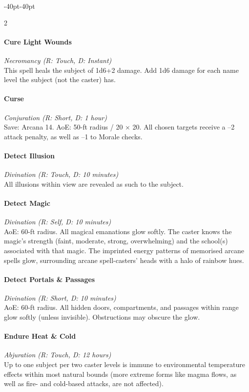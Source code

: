 \documentclass{book}
\begin{document}
\begin{adjustwidth}{-40pt}{-40pt}
\begin{multicols}{2}
\paragraph{Cure Light Wounds}\label{cure-light-wounds}
\emph{Necromancy (R: Touch, D: Instant)}\\
This spell heals the subject of 1d6+2 damage. Add 1d6 damage for each
name level the subject (not the caster) has.

\paragraph{Curse}\label{curse}
\emph{Conjuration (R: Short, D: 1 hour)}\\
Save: Arcana 14. AoE: 50-ft radius / 20 × 20. All chosen targets receive
a --2 attack penalty, as well as --1 to Morale checks.

\paragraph{Detect Illusion}\label{detect-illusion}
\emph{Divination (R: Touch, D: 10 minutes)}\\
All illusions within view are revealed as such to the subject.

\paragraph{Detect Magic}\label{detect-magic}
\emph{Divination (R: Self, D: 10 minutes)}\\
AoE: 60-ft radius. All magical emanations glow softly. The caster knows
the magic's strength (faint, moderate, strong, overwhelming) and the
school(s) associated with that magic. The imprinted energy patterns of
memorised arcane spells glow, surrounding arcane spell-casters' heads
with a halo of rainbow hues.

\paragraph{Detect Portals \& Passages}\label{detect-portals-passages}
\emph{Divination (R: Short, D: 10 minutes)}\\
AoE: 60-ft radius. All hidden doors, compartments, and passages within
range glow softly (unless invisible). Obstructions may obscure the glow.

\paragraph{Endure Heat \& Cold}\label{endure-heat-cold}
\emph{Abjuration (R: Touch, D: 12 hours)}\\
Up to one subject per two caster levels is immune to environmental
temperature effects within most natural bounds (more extreme forms like
magma flows, as well as fire- and cold-based attacks, are not affected).


\end{multicols}
\end{adjustwidth}
\end{document}
